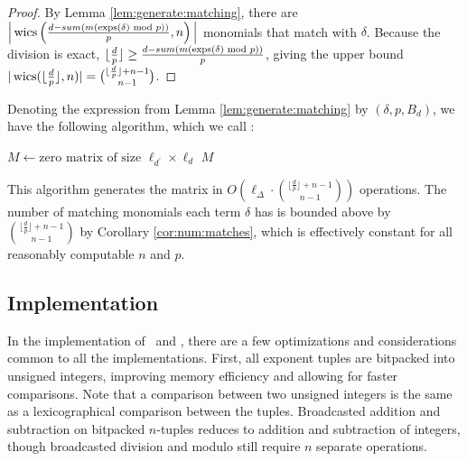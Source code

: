 \begin{proof}
    By Lemma \ref{lem:generate:matching}, there are 
    $\Big |\operatorname{wics} \left(\frac{d - sum(m(\operatorname{exps}(\delta) \text{ mod } p))}{p}, n \right) \Big |$ 
    monomials that match with $\delta$.
    Because the division is exact, 
    $\lfloor \frac{d}{p} \rfloor \geq \frac{d - sum(m(\operatorname{exps}(\delta) \text{ mod } p))}{p}$,
    giving the upper bound 
    $|\operatorname{wics}(\lfloor \frac{d}{p} \rfloor, n)| = \binom{\lfloor \frac{d}{p} \rfloor + n - 1}{n - 1}$.
\end{proof}

Denoting the expression from Lemma \ref{lem:generate:matching} 
by $(\delta, p, B_d)$, we have
the following algorithm, which we call \wicsalg:

\begin{algorithm}[H]
    \caption{Matrix of multiply then split: \wicsalg}
    $M \gets \text{zero matrix of size } \ell_{d^\prime} \times \ell_d $\;
    \Return $M$
    \label{alg:matrix:WICS}
\end{algorithm}

This algorithm 
generates the matrix in 
$O \left( \ell_{\Delta} \cdot \binom{\lfloor \frac{d}{p} \rfloor + n - 1}{n - 1} \right)$ operations.
The number of matching monomials each term $\delta$ 
has is bounded above by $\binom{\lfloor \frac{d}{p} \rfloor + n - 1}{n - 1}$ 
by Corollary \ref{cor:num:matches}, which is 
effectively constant for all reasonably computable $n$ and $p$.

\subsection{Implementation}

In the implementation of \triv ~and \wicsalg, there are a 
few optimizations and considerations common to all the implementations.
First, all exponent tuples are bitpacked into 
unsigned integers, improving memory efficiency 
and allowing for faster comparisons.
Note that a comparison between two unsigned integers 
is the same as a lexicographical comparison between the tuples.
Broadcasted addition and subtraction on bitpacked 
$n$-tuples reduces to addition and subtraction of 
integers, though broadcasted division and modulo still 
require $n$ separate operations.

